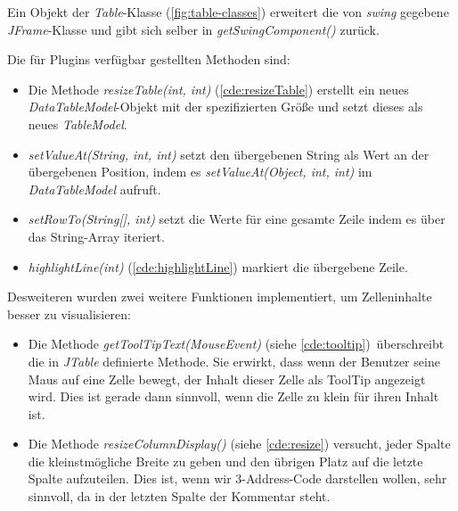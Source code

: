Ein Objekt der \textit{Table}-Klasse (\cref{fig:table-classes}) erweitert die
von \textit{swing} gegebene \textit{JFrame}-Klasse und gibt sich selber in 
\textit{getSwingComponent()} zurück.

Die für Plugins verfügbar gestellten Methoden sind:
\begin{itemize}
  \item Die Methode \textit{resizeTable(int, int)} (\cref{cde:resizeTable}) erstellt ein neues
    \textit{DataTableModel}-Objekt mit der spezifizierten Größe und setzt dieses
    als neues \textit{TableModel}.
  \item \textit{setValueAt(String, int, int)} setzt den übergebenen String
    als Wert an der übergebenen Position, indem es \textit{setValueAt(Object, int, int)}
    im \textit{DataTableModel} aufruft.
  \item \textit{setRowTo(String[], int)}
    setzt die Werte für eine gesamte Zeile indem es über das String-Array iteriert.
  \item \textit{highlightLine(int)} (\cref{cde:highlightLine})
    markiert die übergebene Zeile.
\end{itemize}

Desweiteren wurden zwei weitere Funktionen implementiert, um Zelleninhalte
besser zu visualisieren:\\
\begin{itemize}
  \item Die Methode \textit{getToolTipText(MouseEvent)} (siehe \cref{cde:tooltip}) überschreibt die in \textit{JTable}
    definierte Methode. Sie erwirkt, dass wenn der Benutzer seine Maus auf eine
    Zelle bewegt, der Inhalt dieser Zelle als ToolTip angezeigt wird. Dies ist gerade dann
    sinnvoll, wenn die Zelle zu klein für ihren Inhalt ist.\\
  \item Die Methode \textit{resizeColumnDisplay()} (siehe \cref{cde:resize}) versucht, jeder Spalte die
    kleinstmögliche Breite zu geben und den übrigen Platz auf die letzte Spalte aufzuteilen.
    Dies ist, wenn wir 3-Address-Code darstellen wollen, sehr sinnvoll, da in der letzten Spalte der Kommentar steht.
\end{itemize}



\newpage
